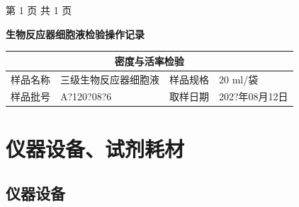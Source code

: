 \documentclass[UTF8,10pt,a4paper,fontset=fandol]{ctexart}
\newcommand{\fieldvalue}[1]{#1}
\newcommand{\handwritten}[1]{#1}
\begin{document}
\vfill
\begin{center}
第 1 页 共 1 页
\end{center}

\newpage

\begin{center}
\textbf{生物反应器细胞液检验操作记录}
\end{center}

\begin{center}
\begin{tabular}{|p{2.8cm}|p{6.0cm}|p{2.2cm}|p{3.2cm}|}
\hline
\multicolumn{4}{|c|}{密度与活率检验} \\ \hline
样品名称 &
\fieldvalue{\handwritten{三级生物反应器细胞液}} &
样品规格 &
\fieldvalue{\handwritten{20}} ml/袋 \\ \hline
样品批号 &
\fieldvalue{\handwritten{A?120?08?6}} &
取样日期 &
\fieldvalue{\handwritten{202?年08月12日}} \\ \hline
\end{tabular}
\end{center}

\section{仪器设备、试剂耗材}

\subsection{仪器设备}
\end{document}
